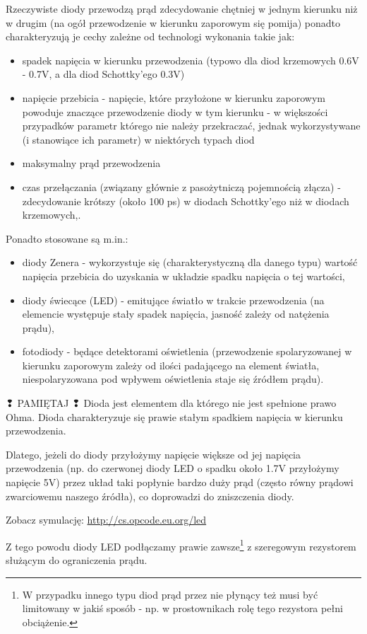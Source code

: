 Rzeczywiste diody przewodzą prąd zdecydowanie chętniej w jednym kierunku niż w drugim (na ogół przewodzenie w kierunku zaporowym się pomija) ponadto charakteryzują je cechy zależne od technologi wykonania takie jak:
\begin{itemize}
\item spadek napięcia w kierunku przewodzenia (typowo dla diod krzemowych 0.6V - 0.7V, a dla diod Schottky’ego 0.3V)
\item napięcie przebicia - napięcie, które przyłożone w kierunku zaporowym powoduje znaczące przewodzenie diody w tym kierunku - w większości przypadków parametr którego nie należy przekraczać, jednak wykorzystywane (i stanowiące ich parametr) w niektórych typach diod
\item maksymalny prąd przewodzenia
\item czas przełączania (związany głównie z pasożytniczą pojemnością złącza) - zdecydowanie krótszy (około 100 ps) w diodach Schottky’ego niż w diodach krzemowych,.
\end{itemize}

\noindent
Ponadto stosowane są m.in.:
\begin{itemize}
\item diody Zenera - wykorzystuje się (charakterystyczną dla danego typu) wartość napięcia przebicia do uzyskania w układzie spadku napięcia o tej wartości,
\item diody świecące (LED) - emitujące światło w trakcie przewodzenia (na elemencie występuje stały spadek napięcia, jasność zależy od natężenia prądu),
\item fotodiody - będące detektorami oświetlenia (przewodzenie spolaryzowanej w kierunku zaporowym zależy od ilości padającego na element światła, niespolaryzowana pod wpływem oświetlenia staje się źródłem prądu).
\end{itemize}

\begin{ProTip}{{\Symbola ❢} PAMIĘTAJ {\Symbola ❢}}
Dioda jest elementem dla którego nie jest spełnione prawo Ohma. Dioda charakteryzuje się prawie stałym spadkiem napięcia w kierunku przewodzenia.

\vspace{5pt}
Dlatego, jeżeli do diody przyłożymy napięcie większe od jej napięcia przewodzenia (np. do czerwonej diody LED o spadku około 1.7V przyłożymy napięcie 5V) przez układ taki popłynie bardzo duży prąd (często równy prądowi zwarciowemu naszego źródła), co doprowadzi do zniszczenia diody.

Zobacz symulację: \url{http://cs.opcode.eu.org/led}

\vspace{5pt}
Z tego powodu diody LED podłączamy prawie zawsze\footnote{W przypadku innego typu diod prąd przez nie płynący też musi być limitowany w jakiś sposób - np. w prostownikach rolę tego rezystora pełni obciążenie.} z szeregowym rezystorem służącym do ograniczenia prądu.
\end{ProTip}

